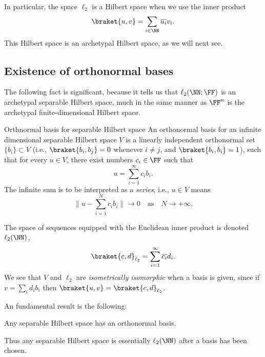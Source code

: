 In particular, the space $\ell_2$ is a Hilbert space when we use the inner product
\begin{equation}
    \braket{u,v} = \sum_{i\in\NN} \overline{u_i} v_i.
\end{equation}
This Hilbert space is an archetypal Hilbert space, as we will next see.

\subsection{Existence of orthonormal bases}


The following fact is significant, because it tells us that $\ell_2(\NN;\FF)$ is an archetypal separable Hilbert space, much in the same manner as $\FF^n$ is the archetypal finite-dimensional Hilbert space.


\begin{myDefinition}{Orthnormal basis for separable Hilbert space}{}
An orthonormal basis for an infinite dimensional separable Hilbert space $V$ is a linearly independent orthonormal set $\{b_i\}\subset V$ (i.e., $\braket{b_i,b_j} = 0$ whenever $i\neq j$, and $\braket{b_i,b_i} = 1$), such that for every $u \in V$, there exist numbers $c_i \in \FF$ such that
\begin{equation}
    u = \sum_{i=1}^\infty c_i b_i.
\end{equation}
The infinite sum is to be interpreted as a \emph{series}, i.e., $u \in V$ means
\begin{equation}
    \|u - \sum_{i=1}^N c_i b_i\| \to 0 \quad \text{as} \quad N\to+\infty.
\end{equation}

The space of sequences equipped with the Euclidean inner product is denoted $\ell_2(\NN)$,
\begin{equation}
    \braket{c,d}_{\ell_2} = \sum_{i=1}^\infty \overline{c_i} d_i.
\end{equation}
We see that $V$ and $\ell_2$ are \emph{isometrically isomorphic} when a basis is given, since if $v = \sum_i d_i b_i$ then $\braket{u,v}= \braket{c,d}_{\ell_2}$.
\end{myDefinition}

An fundamental result is the following:
\begin{myTheorem}{}{}
Any separable Hilbert space has an orthonormal basis.
\end{myTheorem}
Thus any separable Hilbert space is essentially $\ell_2(\NN)$ after a basis has been chosen.  





